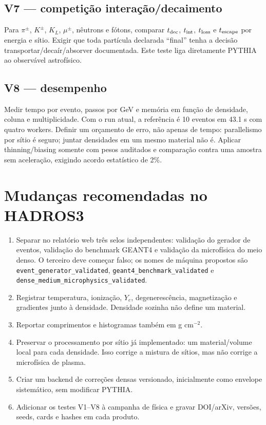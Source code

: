 \documentclass[11pt,a4paper]{article}
\newcommand{\code}[1]{\texttt{#1}}
\begin{document}
\subsection*{V7 --- competição interação/decaimento}
Para $\pi^\pm$, $K^\pm$, $K_L$, $\mu^\pm$, nêutrons e fótons, comparar
$t_{\rm dec}$, $t_{\rm int}$, $t_{\rm loss}$ e $t_{\rm escape}$ por energia e
sítio. Exigir que toda partícula declarada ``final'' tenha a decisão
transportar/decaír/absorver documentada. Este teste liga diretamente PYTHIA
ao observável astrofísico.

\subsection*{V8 --- desempenho}
Medir tempo por evento, passos por GeV e memória em função de densidade,
coluna e multiplicidade. Com o run atual, a referência é 10 eventos em 43.1 s
com quatro workers. Definir um orçamento de erro, não apenas de tempo:
parallelismo por sítio é seguro; juntar densidades em um mesmo material não é.
Aplicar thinning/biasing somente com pesos auditados e comparação contra uma
amostra sem aceleração, exigindo acordo estatístico de 2\%.

\section{Mudanças recomendadas no HADROS3}

\begin{enumerate}
\item Separar no relatório web três selos independentes: validação do gerador
de eventos, validação do benchmark GEANT4 e validação da microfísica do meio
denso. O terceiro deve começar falso; os nomes de máquina propostos são
\code{event\_generator\_validated}, \code{geant4\_benchmark\_validated} e
\code{dense\_medium\_microphysics\_validated}.
\item Registrar temperatura, ionização, $Y_e$, degenerescência, magnetização e
gradientes junto à densidade. Densidade sozinha não define um material.
\item Reportar comprimentos e histogramas também em g cm$^{-2}$.
\item Preservar o processamento por sítio já implementado: um material/volume
local para cada densidade. Isso corrige a mistura de sítios, mas não corrige a
microfísica de plasma.
\item Criar um backend de correções densas versionado, inicialmente como
envelope sistemático, sem modificar PYTHIA.
\item Adicionar os testes V1--V8 à campanha de física e gravar DOI/arXiv,
versões, seeds, cards e hashes em cada produto.
\end{enumerate}
\end{document}
